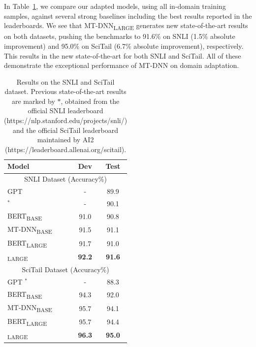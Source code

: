 In Table~\ref{tab:nli}, we compare our adapted models, using all in-domain training samples, against several strong baselines including the best results reported in the leaderboards. We see that MT-DNN\textsubscript{LARGE} generates new state-of-the-art results on both datasets, pushing the benchmarks to 91.6\% on SNLI (1.5\% absolute improvement) and 95.0\% on SciTail (6.7\% absolute improvement), respectively. This results in the new state-of-the-art for both SNLI and SciTail. All of these demonstrate the exceptional performance of MT-DNN on domain adaptation.
\begin{table}[htb!]
	\begin{center}
		\begin{tabular}{l | c | c }\hline
	   \bf Model &Dev& Test  \\ \hline 

		\multicolumn{3}{c}{ SNLI Dataset (Accuracy\%)}  \\ \hline 
		GPT \cite{gpt2018} &- & 89.9 \\
		\hline
		\citet{kim2018semantic}$^*$ &- &90.1 \\ \hline 
		BERT\textsubscript{BASE} &91.0 & 90.8 \\
		\hline		
		MT-DNN\textsubscript{BASE} &91.5 & 91.1 \\
		\hline
		BERT\textsubscript{LARGE} &91.7& 91.0\\ \hline		
		{\MNAME}\textsubscript{LARGE}&\textbf{92.2}& \textbf{91.6}\\ \hline		
		\hline
		\multicolumn{3}{c}{ SciTail Dataset (Accuracy\%)}  \\ \hline 	GPT \cite{gpt2018}$^*$ &- &88.3 \\ \hline
		BERT\textsubscript{BASE} &94.3 & 92.0 \\ \hline
		MT-DNN\textsubscript{BASE} &95.7 &94.1 \\
		\hline
		BERT\textsubscript{LARGE} &95.7& 94.4\\ \hline		
		{\MNAME}\textsubscript{LARGE} &\textbf{96.3}& \textbf{95.0}\\ \hline		
		\end{tabular}
	\end{center}
	\caption{Results on the SNLI and SciTail dataset. Previous state-of-the-art results are marked by $*$, obtained from the official SNLI leaderboard (https://nlp.stanford.edu/projects/snli/) and the official SciTail leaderboard maintained by AI2 (https://leaderboard.allenai.org/scitail). 
	}
	\label{tab:nli}

\end{table}


